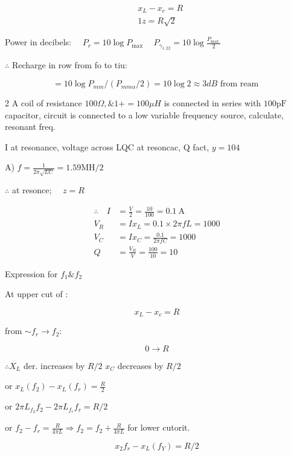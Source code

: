 \documentclass[12pt, a4paper]{article}
\begin{document}
	$$
		\begin{aligned}
			 & x_{L}-x_{c}=R  \\
			 & 1 z=R \sqrt{2}
		\end{aligned}
	$$

	Power in decibels: $\quad P_{r}=10 \log P_{\text {max }} \quad P_{\gamma_{1,22}}=10 \log \frac{P_{\text {max }}}{2}$

$\therefore$ Recharge in row from fo to tiu:

	$$
		=10 \log P_{m m} /\left(P_{m m \alpha} / 2\right)=10 \log 2 \approx 3 d B \text { from ream }
	$$

	2 A coil of resistance $100 \Omega, \& 1+=100 \mu H$ is connected in series with $100 \mathrm{pF}$ capacitor, circuit is connected to a low variable frequency source, calculate, resonant freq.

	I at resonance, voltage across LQC at resoncac, Q fact, $y=104$

	A) $f=\frac{1}{2 \pi \sqrt{L C}}=1.59 \mathrm{MH/2}$

$\therefore$ at resonce; $\quad z=R$

	$$
		\begin{aligned}
			\therefore \quad I & =\frac{V}{2}=\frac{10}{100}=0.1 \mathrm{~A} \\
			V_{R}              & =I x_{L}=0.1 \times 2 \pi f L=1000          \\
			V_{C}              & =I x_{C}=\frac{0.1}{2 \pi f C}=1000         \\
			Q                  & =\frac{V_{R}}{V}=\frac{100}{10}=10
		\end{aligned}
	$$

	Expression for $f_{1} \& f_{2}$

	At upper cut of :

	$$
		x_{L}-x_{c}=R
	$$

	from $\sim f_{r} \rightarrow f_{2}:$

	$$
		0 \rightarrow R
	$$

$\therefore X_{L}$ der. increases by $R / 2$ $x_{C}$ decreases by $R / 2$

	or $x_{L}\left(f_{2}\right)-x_{L}\left(f_{r}\right)=\frac{R}{2}$

	or $2 \pi L_{f_{2}} f_{2}-2 \pi L_{f_{r}} f_{r}=R / 2$

	or $f_{2}-f_{r}=\frac{R}{4 \pi L} \Rightarrow f_{2}=f_{2}+\frac{R}{4 \pi L}$ for lower cutorit.

	$$
		x_{2} f_{r}-x_{L}\left(f_{Y}\right)=R / 2
	$$
\end{document}
